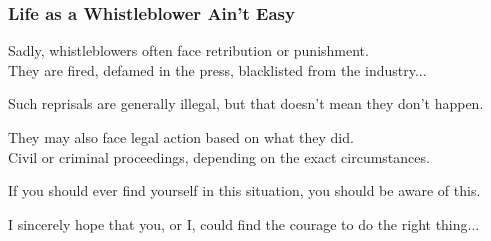 \begin{frame}
\frametitle{Life as a Whistleblower Ain't Easy}

Sadly, whistleblowers often face retribution or punishment.\\
\quad They are fired, defamed in the press, blacklisted from the industry...

Such reprisals are generally illegal, but that doesn't mean they don't happen.

They may also face legal action based on what they did.\\
\quad Civil or criminal proceedings, depending on the exact circumstances.

If you should ever find yourself in this situation, you should be aware of this.

I sincerely hope that you, or I, could find the courage to do the right thing...

\end{frame}




